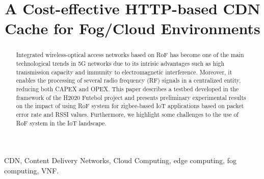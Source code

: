 \documentclass[conference]{IEEEtran}
\begin{document}

	\title{A Cost-effective HTTP-based CDN Cache for Fog/Cloud Environments}

\author{
}

	\maketitle

	\begin{abstract}
	    Integrated wireless-optical access networks based on \ac{RoF} has become one of the main technological trends in \ac{5G} networks due to its intrisic advantages such as high transmission capacity and immunity to electromagnetic interference. Moreover, it enables the processing of several radio frequency (RF) signals in a centralized entity, reducing both \ac{CAPEX} and \ac{OPEX}. 
	    This paper describes a testbed developed in the framework of the H2020 Futebol project and presents preliminary experimental results on the impact of using \ac{RoF} system for zigbee-based \ac{IoT} applications based on packet error rate and \ac{RSSI} values.
	    Furthermore, we highlight some challenges to the use of \ac{RoF} system in the \ac{IoT} landscape.
	\end{abstract}

    \begin{IEEEkeywords}
    	CDN, Content Delivery Networks, Cloud Computing, edge computing, fog computing, VNF.
    \end{IEEEkeywords}

    \acresetall
    
    
    
    
    
    

    
    
    
    
    
    
    

	
	
	
\end{document}
